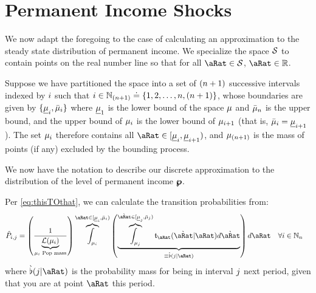 \documentclass[\econtexRoot/BufferStockTheory.tex]{subfiles}
\begin{document}

\section{Permanent Income Shocks}

We now adapt the foregoing to the case of calculating an approximation to the steady state distribution of permanent income. We specialize the space $\mathcal{S}$ to contain points on the real number line so that for all $\pnt \in \SetFullCnts$, $\pnt \in \reals$.

Suppose we have partitioned the space into a set of $(n+1)$ successive intervals indexed by $i$ such that $i \in \mathbb{N}_{(n+1)} \doteq \{1,2,\dots,n,(n+1)\}$, whose boundaries are given by $\{\underline{\mu}_{i},\bar{\mu}_{i}\}$ where $\underline{\mu}_{1}$ is the lower bound of the space $\mu$ and $\bar{\mu}_{n}$ is the upper bound, and the upper bound of $\mu_{i}$ is the lower bound of $\mu_{i+1}$ (that is, $\bar{\mu}_{i}=\underline{\mu}_{i+1}$).  The set $\mu_{i}$ therefore contains all  $\pnt \in [\Bot{\SetPartCnts}_{\thisBin},\Bot{\SetPartCnts}_{\thisBin+1})$, and $\mu_{(n+1)}$ is the mass of points (if any) excluded by the bounding process.

We now have the notation to describe our discrete approximation to the distribution of the level of permanent income $\pmb{\wp}$.  %



Per \eqref{eq:thisTOthat}, we can calculate the transition probabilities from:
\begin{align}
  \TnsMrkv_{\thisBin,\thatBin} &= \left(\frac{1}{\underbrace{\Lebes(\SetPartCnts_{\thisBin})}_{\SetPartCnts_{\thisBin}\text{~Pop mass}}}\right)\overbrace{\int_{\SetPartCnts_{\thisBin}}}^{\pnt\in[\Bot{\SetPartCnts}_{\thisBin},\Top{\SetPartCnts}_{\thisBin})}\left(\underbrace{\overbrace{\int_{\SetPartCnts_{\thatBin}}}^{\Nxt{\pnt}\in[\Bot{\SetPartCnts}_{\thatBin},\Top{\SetPartCnts}_{\thatBin})}\DnsPntNxtFmPntNow_{\pnt}(\Nxt{\pnt}|\pnt){d\Nxt{\pnt}}}_{\equiv \Nxt{\PrbBinNxtFmPntNow}(\thatBin|\pnt)} \right){d\pnt}~~~\forall\thisBin\in\Nteger_{\NumAprxStes} \label{eq:thispTOthatp}
\end{align}
where $\Nxt{\PrbBinNxtFmPntNow}(\thatBin|\pnt)$ is the probability mass for being in interval $j$ next period, given that you are at point $\pnt$ this period.
\end{document}
